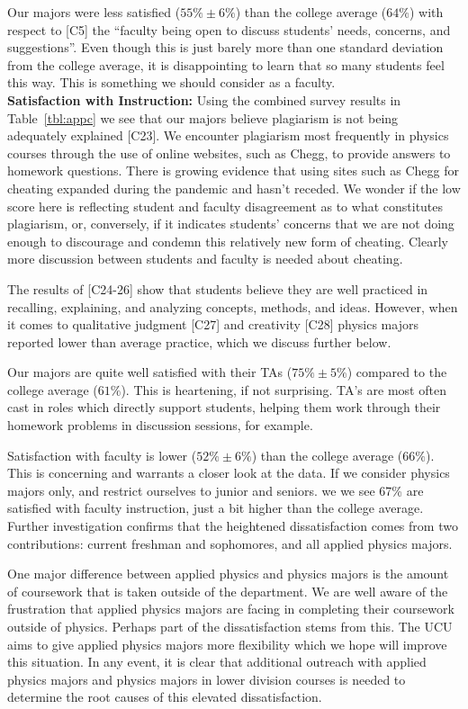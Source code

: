 \documentclass[12pt]{article}
\begin{document}
Our majors were less satisfied ($55\%\pm6\%$) than the college
average ($64\%$) with respect to [C5] the ``faculty being open to
discuss students' needs, concerns, and suggestions''.  Even though
this is just barely more than one standard deviation from the college
average, it is disappointing to learn that so many students feel this
way.  This is something we should consider as a faculty.\\[3pt]

\noindent
{\bf Satisfaction with Instruction:} Using the combined survey results
in Table~\ref{tbl:appc} we see that our majors believe plagiarism is
not being adequately explained [C23].  We encounter plagiarism most
frequently in physics courses through the use of online websites, such
as Chegg, to provide answers to homework questions.  There is growing
evidence that using sites such as Chegg for cheating expanded during
the pandemic and hasn't receded.  We wonder if the low score here is
reflecting student and faculty disagreement as to what constitutes
plagiarism, or, conversely, if it indicates students' concerns that we
are not doing enough to discourage and condemn this relatively new
form of cheating.  Clearly more discussion between students and
faculty is needed about cheating.

The results of [C24-26] show that students believe they are well
practiced in recalling, explaining, and analyzing concepts, methods,
and ideas.  However, when it comes to qualitative judgment [C27] and
creativity [C28] physics majors reported lower than average practice,
which we discuss further below.

Our majors are quite well satisfied with their TAs ($75\% \pm 5\%$)
compared to the college average ($61\%$).  This is heartening, if not
surprising.  TA's are most often cast in roles which directly support
students, helping them work through their homework problems in
discussion sessions, for example.

Satisfaction with faculty is lower ($52\% \pm 6\%$) than the college
average ($66\%$).  This is concerning and warrants a closer look at the
data.  If we consider physics majors only, and restrict ourselves to
junior and seniors. we we see 67\% are satisfied with faculty
instruction, just a bit higher than the college average.  Further
investigation confirms that the heightened dissatisfaction comes from
two contributions: current freshman and sophomores, and all applied
physics majors.

One major difference between applied physics and physics majors is the
amount of coursework that is taken outside of the department. We
are well aware of the frustration that applied physics majors are
facing in completing their coursework outside of physics.  Perhaps
part of the dissatisfaction stems from this.  The UCU aims to give
applied physics majors more flexibility which we hope will improve
this situation.  In any event, it is clear that additional outreach
with applied physics majors and physics majors in lower division
courses is needed to determine the root causes of this elevated
dissatisfaction.\\[3pt]
\end{document}
